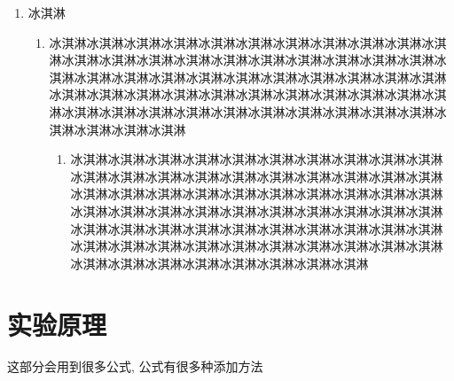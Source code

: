 \documentclass[11pt]{article}
\begin{document}
\begin{enumerate}
\begin{enumerate}
    \end{enumerate}
    \item 冰淇淋
    \begin{enumerate}
        \item 冰淇淋冰淇淋冰淇淋冰淇淋冰淇淋冰淇淋冰淇淋冰淇淋冰淇淋冰淇淋冰淇淋冰淇淋冰淇淋冰淇淋冰淇淋冰淇淋冰淇淋冰淇淋冰淇淋冰淇淋冰淇淋冰淇淋冰淇淋冰淇淋冰淇淋冰淇淋冰淇淋冰淇淋冰淇淋冰淇淋冰淇淋冰淇淋冰淇淋冰淇淋冰淇淋冰淇淋冰淇淋冰淇淋冰淇淋冰淇淋冰淇淋冰淇淋冰淇淋冰淇淋冰淇淋冰淇淋冰淇淋冰淇淋冰淇淋冰淇淋冰淇淋冰淇淋冰淇淋冰淇淋冰淇淋冰淇淋冰淇淋
        \begin{enumerate}
            \item 冰淇淋冰淇淋冰淇淋冰淇淋冰淇淋冰淇淋冰淇淋冰淇淋冰淇淋冰淇淋冰淇淋冰淇淋冰淇淋冰淇淋冰淇淋冰淇淋冰淇淋冰淇淋冰淇淋冰淇淋冰淇淋冰淇淋冰淇淋冰淇淋冰淇淋冰淇淋冰淇淋冰淇淋冰淇淋冰淇淋冰淇淋冰淇淋冰淇淋冰淇淋冰淇淋冰淇淋冰淇淋冰淇淋冰淇淋冰淇淋冰淇淋冰淇淋冰淇淋冰淇淋冰淇淋冰淇淋冰淇淋冰淇淋冰淇淋冰淇淋冰淇淋冰淇淋冰淇淋冰淇淋冰淇淋冰淇淋冰淇淋冰淇淋冰淇淋冰淇淋冰淇淋冰淇淋冰淇淋冰淇淋冰淇淋冰淇淋冰淇淋冰淇淋
        \end{enumerate}
    \end{enumerate}
\end{enumerate}

\section{实验原理}

这部分会用到很多公式, 公式有很多种添加方法
\end{document}
